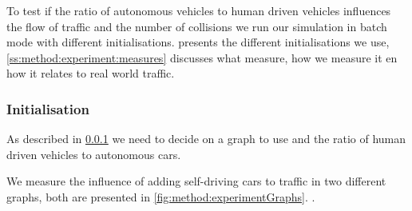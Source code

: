 To test if the ratio of autonomous vehicles to human driven vehicles influences the flow of traffic and the number of collisions we run our simulation in batch mode with different initialisations.  presents the different initialisations we use, \cref{ss:method:experiment:measures} discusses what measure, how we measure it en how it relates to real world traffic. 

\subsubsection{Initialisation}
\label{ss:method:experiment:init}
As described in \cref{ss:method:experiment:init} we need to decide on a graph to use and the ratio of human driven vehicles to autonomous cars. 

We measure the influence of adding self-driving cars to traffic in two different graphs, both are presented in \cref{fig:method:experimentGraphs}.  .  


